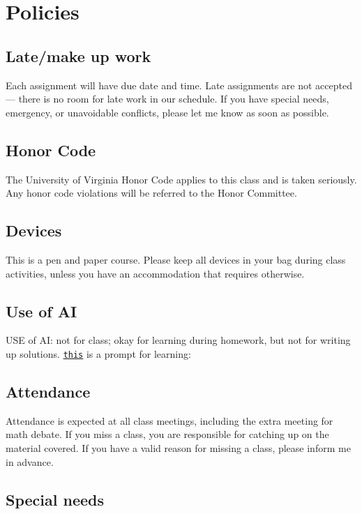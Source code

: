 \documentclass[oneside,11pt]{amsart}
\begin{document}
\section{Policies}

\subsection{Late/make up work}

Each assignment will have due date and time. Late assignments are not accepted --- there is no room for late work in our schedule. If you have special needs, emergency, or unavoidable conflicts, please let me know as soon as possible.

\subsection{Honor Code}
The University of Virginia Honor Code applies to this class and is taken seriously. Any honor code violations will be referred to the Honor Committee. 

\subsection{Devices}

This is a pen and paper course. Please keep all devices in your bag during class activities, unless you have an accommodation that requires otherwise.

\subsection{Use of AI}

USE of AI: not for class; okay for learning during homework, but not for writing up solutions.
\href{https://gist.githubusercontent.com/lenis2000/cb5ea004f8aa6461be71398e19ae488e/raw/a0103eab0b865a1cedf2f3bf3c00d217bd294005/AI_hint_prompt.txt}{\texttt{this}} is a prompt for learning: 


\subsection{Attendance}

Attendance is expected at all class meetings, including the extra meeting for math debate. If you miss a class, you are responsible for catching up on the material covered. If you have a valid reason for missing a class, please inform me in advance.

\subsection{Special needs}
\end{document}
